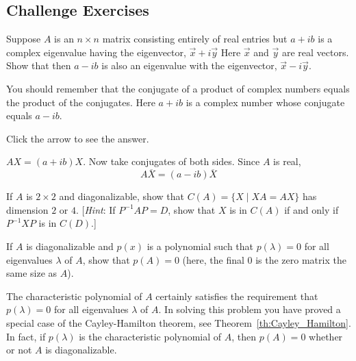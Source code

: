 \documentclass{ximera}
\begin{document}
\subsection*{Challenge Exercises}

\begin{problem}\label{prb:8.32} Suppose $A$ is an $n\times n$ matrix consisting entirely of real
entries but $a+ib$ is a complex eigenvalue having the eigenvector, $\vec{x}+i\vec{y}$ Here $\vec{x}$ and $\vec{y}$ are real vectors. Show
that then $a-ib$ is also an eigenvalue with the eigenvector, $\vec{x}-i\vec{y}$.

\begin{hint}
You should remember that the conjugate of a
product of complex numbers equals the product of the conjugates. Here $a+ib$
is a complex number whose conjugate equals $a-ib.$


Click the arrow to see the answer.
\begin{expandable}
$AX=\left(
a+ib\right)X$. Now take conjugates of both sides. Since $A$ is
real,
\[
A\overline{X}=\left( a-ib\right) \overline{X}
\]
\end{expandable}
 
\end{hint}
\end{problem}



\begin{problem}\label{prb:2x2diagonalizable}
If $A$ is $2 \times 2$ and diagonalizable, show that $C(A) = \{X \mid XA = AX\}$ has dimension $2$ or $4$. [\textit{Hint}: If $P^{-1}AP = D$, show that $X$ is in $C(A)$ if and only if $P^{-1}XP$ is in $C(D)$.]
\end{problem}

\begin{problem}\label{prb:2x2diagonalizable_poly}
If $A$ is diagonalizable and $p(x)$ is a polynomial such that $p(\lambda) = 0$ for all eigenvalues $\lambda$ of $A$, show that $p(A) = 0$ (here, the final 0 is the zero matrix the same size as $A$).
\begin{remark}
The characteristic polynomial of $A$ certainly satisfies the requirement that $p(\lambda) = 0$ for all eigenvalues $\lambda$ of $A$.  In solving this problem you have proved a special case of the Cayley-Hamilton theorem, see Theorem~\ref{th:Cayley_Hamilton}.  In fact, if $p(\lambda)$ is the characteristic polynomial of $A$, then $p(A) = 0$ whether or not $A$ is diagonalizable.
\end{remark}
\end{problem}
\end{document}
